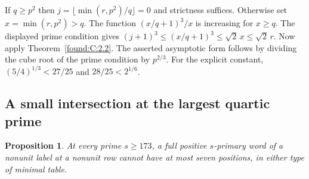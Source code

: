 \documentclass[11pt,a4paper]{article}
\numberwithin{equation}{section}
\newtheorem{proposition}[theorem]{Proposition}
\theoremstyle{remark}
\begin{document}
If $q\ge p^2$ then $j=\lfloor\min(r,p^2)/q\rfloor=0$ and strictness suffices. Otherwise set $x=\min(r,p^2)>q$. The function $(x/q+1)^3/x$ is increasing for $x\ge q$. The displayed prime condition gives $(j+1)^3\le (x/q+1)^3\le\sqrt2\, x\le\sqrt2\,r$. Now apply Theorem~\ref{found:C:2.2}. The asserted asymptotic form follows by dividing the cube root of the prime condition by $p^{2/3}$. For the explicit constant, $(5/4)^{1/3}<27/25$ and $28/25<2^{1/6}$.

\subsection{A small intersection at the largest quartic prime}\label{found:S:8}
\label{found:S:key:sec:minword}

\begin{proposition}\label{found:S:8.1}\label{found:S:key:prop:sevenword}
At every prime $s\ge173$, a full positive $s$-primary word of a nonunit
label at a nonunit row cannot have at most seven positions, in either
type of minimal table.
\end{proposition}
\end{document}
